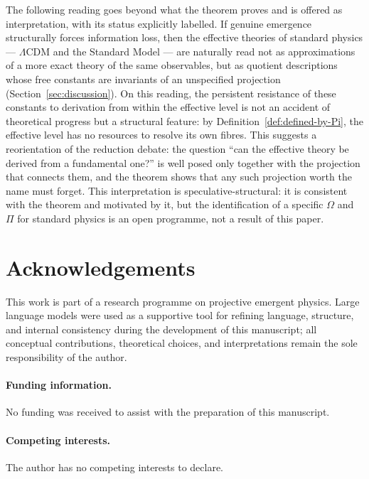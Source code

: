 \documentclass[12pt,a4paper]{article}
\begin{document}
  The following reading goes beyond what the theorem proves and is offered as interpretation, with its status
  explicitly labelled.
  If genuine emergence structurally forces information loss, then the effective theories of standard physics
  --- $\Lambda$CDM and the Standard Model --- are naturally read not as approximations of a more exact theory
  of the same observables, but as quotient descriptions whose free constants are invariants of an unspecified
  projection (Section~\ref{sec:discussion}).
  On this reading, the persistent resistance of these constants to derivation from within the effective level
  is not an accident of theoretical progress but a structural feature: by
  Definition~\ref{def:defined-by-Pi}, the effective level has no resources to resolve its own fibres.
  This suggests a reorientation of the reduction debate: the question ``can the effective theory be derived
  from a fundamental one?'' is well posed only together with the projection that connects them, and the
  theorem shows that any such projection worth the name must forget.
  This interpretation is speculative-structural: it is consistent with the theorem and motivated by it, but
  the identification of a specific $\Omega$ and $\Pi$ for standard physics is an open programme, not a result
  of this paper.

  \section*{Acknowledgements}

  This work is part of a research programme on projective emergent physics.
  Large language models were used as a supportive tool for refining language, structure, and internal
  consistency during the development of this manuscript; all conceptual contributions, theoretical choices,
  and interpretations remain the sole responsibility of the author.

  \paragraph{Funding information.}
  No funding was received to assist with the preparation of this manuscript.

  \paragraph{Competing interests.}
  The author has no competing interests to declare.

  
  
\end{document}
